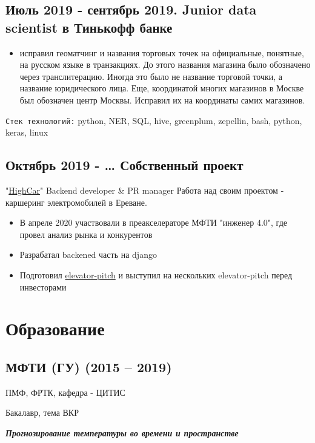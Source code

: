 \documentclass[11pt]{article}
\begin{document}
\subsection{Июль 2019 - сентябрь 2019. Junior data scientist в Тинькофф банке}
\label{sec:org36d7d0f}
\begin{itemize}
\item исправил геоматчинг и названия торговых точек на официальные, понятные, на русском языке в транзакциях. До этого названия магазина было обозначено через транслитерацию. Иногда это было не название торговой точки, а название юридического лица. Еще, координатой многих магазинов в Москве был обозначен центр Москвы. Исправил их на координаты самих магазинов.
\end{itemize}

\texttt{Cтек технологий:} python, NER, SQL, hive, greenplum, zepellin, bash, python, keras, linux
\subsection{Октябрь 2019 - \ldots{} Собственный проект}
\label{sec:org4d30311}
"\href{https://docs.google.com/presentation/d/1AiwyzLKDgDXIaclUwoyGgT-VDJMtJYJQqAMVfbNlB40/edit\#slide=id.p1}{HighCar}"
Backend developer \& PR manager
Работа над своим проектом - каршеринг электромобилей в Ереване.
\begin{itemize}
\item В апреле 2020 участвовали в преакселераторе МФТИ "инженер 4.0", где провел анализ рынка и конкурентов
\item Разрабатал backened часть на django
\item Подготовил \href{https://docs.google.com/presentation/d/1AiwyzLKDgDXIaclUwoyGgT-VDJMtJYJQqAMVfbNlB40/edit\#slide=id.p1}{elevator-pitch} и выступил на нескольких elevator-pitch перед инвесторами
\end{itemize}
\section{Образование}
\label{sec:orgb09a80a}
\subsection{МФТИ (ГУ) (2015 – 2019)}
\label{sec:org9d04821}
ПМФ, ФРТК, кафедра - ЦИТИС

Бакалавр, тема ВКР

\begin{center}
\textbf{\emph{Прогнозирование температуры во времени и пространстве}}
\end{center}
\end{document}

